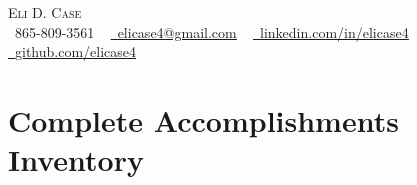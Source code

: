 \documentclass[letterpaper,11pt]{article}
\begin{document}
\begin{center}
    {\large \scshape Eli D. Case} \\ \vspace{1pt}
    \small \raisebox{-0.1\height}\faPhone\ 865-809-3561 ~ \href{mailto:elicase4@gmail.com}{\raisebox{-0.2\height}\faEnvelope\  \underline{elicase4@gmail.com}} ~ 
    \href{https://linkedin.com/in/elicase4}{\raisebox{-0.2\height}\faLinkedin\ \underline{linkedin.com/in/elicase4}}  ~
    \href{https://github.com/elicase4}{\raisebox{-0.2\height}\faGithub\ \underline{github.com/elicase4}}
    \vspace{-4pt}
\end{center}

\section{Complete Accomplishments Inventory}
  \vspace{10pt} 
\end{document}
